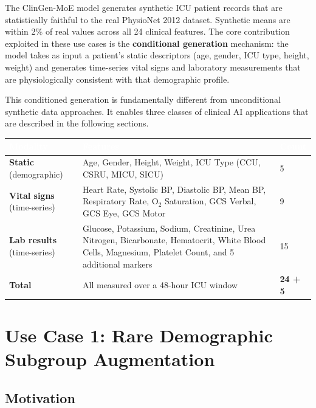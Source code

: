 \documentclass[12pt, a4paper]{article}
\begin{document}
The ClinGen-MoE model generates synthetic ICU patient records that are
statistically faithful to the real PhysioNet 2012 dataset. Synthetic means
are within 2\% of real values across all 24 clinical features. The core
contribution exploited in these use cases is the \textbf{conditional generation}
mechanism: the model takes as input a patient's static descriptors (age, gender,
ICU type, height, weight) and generates time-series vital signs and laboratory
measurements that are physiologically consistent with that demographic profile.

This conditioned generation is fundamentally different from unconditional
synthetic data approaches. It enables three classes of clinical AI applications
that are described in the following sections.

\vspace{8pt}

\begin{table}[H]
\centering
\renewcommand{\arraystretch}{1.4}
\begin{tabularx}{\linewidth}{L{3cm} X C{2cm}}
\toprule
{}
\textcolor{white}{\textbf{Modality}} &
\textcolor{white}{\textbf{Features}} &
\textcolor{white}{\textbf{Count}} \\
\midrule
{}
\textbf{Static} (demographic) &
Age, Gender, Height, Weight, ICU Type
(CCU, CSRU, MICU, SICU) & 5 \\
\textbf{Vital signs} (time-series) &
Heart Rate, Systolic BP, Diastolic BP, Mean BP,
Respiratory Rate, O$_2$ Saturation,
GCS Verbal, GCS Eye, GCS Motor & 9 \\
\textbf{Lab results} (time-series) &
Glucose, Potassium, Sodium, Creatinine,
Urea Nitrogen, Bicarbonate, Hematocrit,
White Blood Cells, Magnesium, Platelet Count,
and 5 additional markers & 15 \\
\midrule
\textbf{Total} &
All measured over a 48-hour ICU window & \textbf{24 + 5} \\
\bottomrule
\end{tabularx}
\end{table}

\section{Use Case 1: Rare Demographic Subgroup Augmentation}

\subsection{Motivation}
\end{document}
